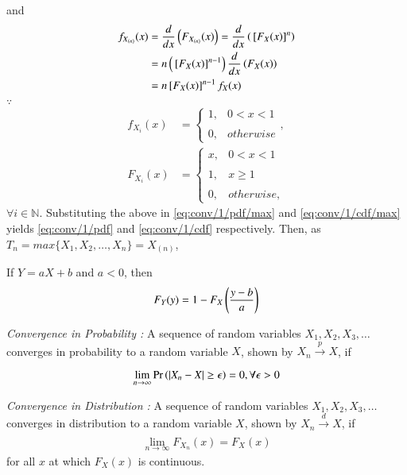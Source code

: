 and 
\begin{align}
   f_{X_{(n)}}(x)&=\dfrac{d}{dx}\left(F_{X_{(n)}}(x)\right)=\dfrac{d}{dx}\left({}\left[F_{X}(x)\right]^{n}\right)\\
   &=n\left({}\left[F_{X}(x)\right]^{n-1}\right)\dfrac{d}{dx}\left(F_{X}(x)\right)\\
   &=n{}\left[F_{X}(x)\right]^{n-1}f_{X}(x)
   \label{eq:conv/1/pdf/max}
\end{align}
$\because $
\begin{align}
    f_{X_{i}}(x)&=\begin{cases}
	1, & 0< x<1 \\~\\[-1em]
	0, & otherwise
	\end{cases},
	\\
	F_{X_{i}}(x)&=\begin{cases}
	x, & 0< x<1 \\~\\[-1em]
	1, & x\geq 1\\~\\[-1em]
	0, & otherwise,
	\end{cases} 
\end{align}
$\forall i\in \mathbb{N}$.  Substituting the above in    \eqref{eq:conv/1/pdf/max} and \eqref{eq:conv/1/cdf/max} yields 	\eqref{eq:conv/1/pdf} and 	\eqref{eq:conv/1/cdf} respectively. 
Then, as $T_{n}=max\{ X_{1},X_{2},\dots,X_{n}\}=X_{(n)}$,
\begin{lemma}
If $Y=aX+b$ and $a<0$, then
\begin{align}
\label{conv/1/eq:form}
    F_{Y}(y)=1-F_{X}\left(\dfrac{y-b}{a}\right)
\end{align}
\end{lemma}
\begin{definition}
{\em	Convergence in Probability :}
A sequence of random variables $X_{1},X_{2},X_{3},\dots$ converges in probability to a random variable $X$, shown by $X_{n}\xrightarrow[]{p}X$, if
\begin{align}
    \displaystyle\lim_{n\to\infty}\Pr\left(|X_{n}-X|\geq\epsilon\right)=0,\forall\epsilon>0
\end{align}
\end{definition}
%
\begin{definition}
	{\em Convergence in Distribution :}
A sequence of random variables $X_{1},X_{2},X_{3},\dots$ converges in distribution to a random variable $X$, shown by $X_{n}\xrightarrow[]{d}X$, if
\begin{align}
    \displaystyle\lim_{n\to\infty}F_{X_{n}}(x)=F_{X}(x)
\end{align}
for all $x$ at which $F_{X}(x)$ is continuous.
\end{definition}
